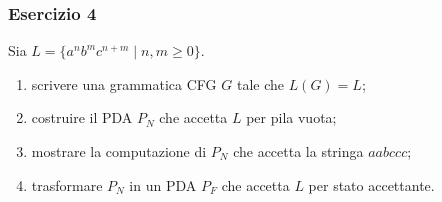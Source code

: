 \begin{frame}[fragile]
        \frametitle{Esercizio 4}
Sia $L = \{ a^n b^m c^{n+m} \mid n, m \ge 0 \}$.
\begin{enumerate}
\item scrivere una grammatica CFG $G$ tale che $L(G) = L$;
\item costruire il PDA $P_N$ che accetta $L$ per pila vuota;
\item mostrare la computazione di $P_N$ che accetta la stringa $aabccc$;
\item trasformare $P_N$ in un PDA $P_F$ che accetta $L$ per stato accettante.
\end{enumerate}
\end{frame}


